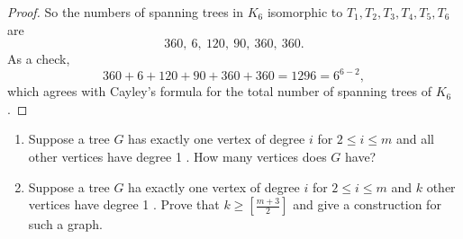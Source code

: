\documentclass[11pt, a4paper]{ctexrep}
\begin{document}
\begin{proof}
    So the numbers of spanning trees in $K_6$ isomorphic to $T_1,T_2,T_3,T_4,T_5,T_6$ are
    \[
        360,\ 6,\ 120,\ 90,\ 360,\ 360.
    \]
    As a check,
    \[
        360+6+120+90+360+360=1296=6^{6-2},
    \]
    which agrees with Cayley's formula for the total number of spanning trees of $K_6$.
\end{proof}


\begin{exercise}
    \begin{enumerate}
        \item[(a)] Suppose a tree $G$ has exactly one vertex of degree $i$ for $2 \leq i \leq m$ and all other vertices have degree 1 . How many vertices does $G$ have?
        \item[(b)] Suppose a tree $G$ ha exactly one vertex of degree $i$ for $2 \leq i \leq m$ and $k$ other vertices have degree 1 . Prove that $k \geq\left[\frac{m+3}{2}\right]$ and give a construction for such a graph.
    \end{enumerate}
\end{exercise}
\end{document}
